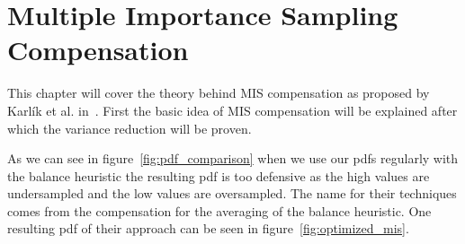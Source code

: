 \chapter{Multiple Importance Sampling Compensation}
\label{ch:mis_compensation}
This chapter will cover the theory behind MIS compensation as proposed by Karl\'ik et al. in~\cite{Karlik2019}.
First the basic idea of MIS compensation will be explained after which the variance reduction will be proven.

As we can see in figure~\ref{fig:pdf_comparison} when we use our pdfs regularly with the balance heuristic
the resulting pdf is too defensive as the high values are undersampled and the low values are oversampled.
The name for their techniques comes from the compensation for the averaging of the balance heuristic.
One resulting pdf of their approach can be seen in figure~\ref{fig:optimized_mis}.

